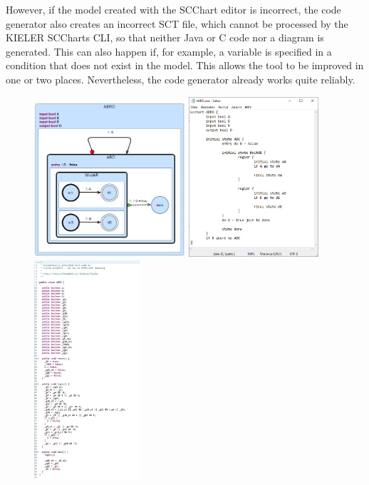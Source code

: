 However, if the model created with the SCChart editor is incorrect, the code generator also creates an incorrect SCT file, which cannot be processed by the KIELER SCCharts CLI, so that neither Java or C code nor a diagram is generated. This can also happen if, for example, a variable is specified in a condition that does not exist in the model. This allows the tool to be improved in one or two places. Nevertheless, the code generator already works quite reliably.
\begin{figure}[h!]
\centering
\includegraphics[width=0.5\textwidth]{bilder/CincoABROModel.png}
\includegraphics[width=0.43\textwidth]{bilder/ABRO_SCT.png}
\includegraphics[width=0.35\textwidth]{bilder/ABROJavaCode.png}

\end{figure}
